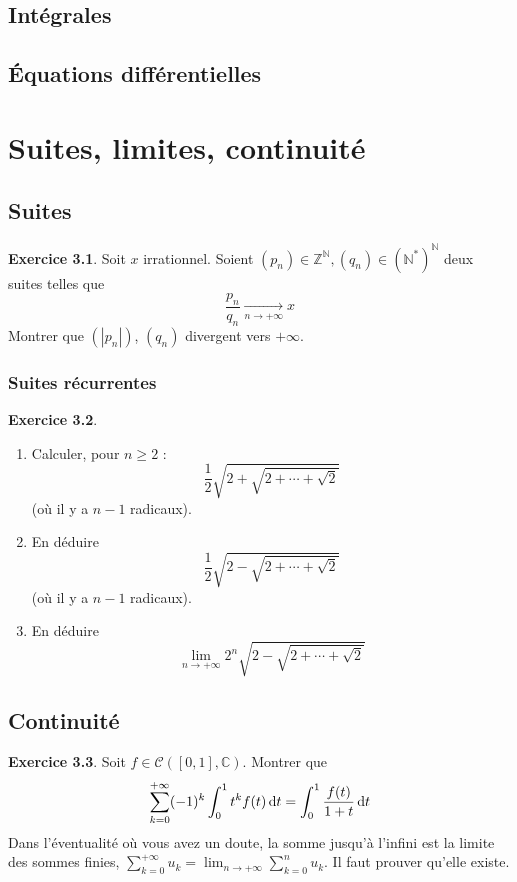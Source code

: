 \documentclass[12pt,a4paper]{book}
\renewcommand{\d}{{\, \rm d}}
\theoremstyle{definition}
\newtheorem{exo}{Exercice}[section]
\theoremstyle{remark}
\newcommand{\N}{\mathbb{N}}
\newcommand{\Z}{\mathbb{Z}}
\newcommand{\C}{\mathbb{C}}
\renewcommand{\d}{{\rm \, d}}
\newcommand{\cont}{\mathcal{C}}
\begin{document}
\section{Intégrales}

\section{Équations différentielles}

\chapter{Suites, limites, continuité}

\section{Suites}

\begin{exo}
    Soit $x$ irrationnel. Soient $(p_n) \in \Z^\N, (q_n) \in (\N^*) ^ \N$ deux suites telles que
    \[\frac{p_n}{q_n}\xrightarrow[n\to +\infty]{} x\]
    Montrer que $(|p_n|)$, $(q_n)$ divergent vers $+\infty$.
\end{exo}

\subsection*{Suites récurrentes}

\begin{exo}
    \begin{enumerate}
        \item Calculer, pour $n \ge 2$ :
        \[\frac{1}{2} \sqrt{2 + \sqrt{2 + \cdots + \sqrt{2}}}\]
        (où il y a $n-1$ radicaux).
        \item En déduire
        \[\frac{1}{2} \sqrt{2 - \sqrt{2 + \cdots + \sqrt{2}}}\]
        (où il y a $n-1$ radicaux).
        \item En déduire
        \[\lim_{n\to +\infty} 2^n \sqrt{2 - \sqrt{2 + \cdots + \sqrt{2}}}\]
    \end{enumerate}
\end{exo}

\section{Continuité}


\begin{exo}
    Soit $f \in \cont([0,1], \C)$. Montrer que
    \[\sum_{k=0}^{+\infty} (-1)^k \int_0^1 t^k f(t) \d t = \int_0^1 \frac{f(t)}{1+t} \d t\]
    Dans l'éventualité où vous avez un doute, la somme jusqu'à l'infini est la limite des sommes finies, $\sum_{k=0}^{+\infty} u_k = \lim_{n\to +\infty} \sum_{k=0}^n u_k$. Il faut prouver qu'elle existe.
\end{exo}
\end{document}
